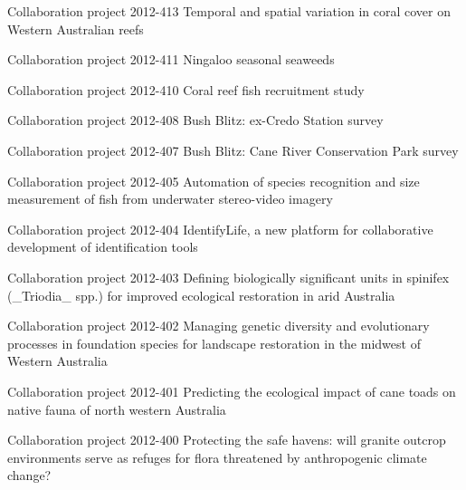 \documentclass[version=last, paper=a4, DIV=18, usenames, dvipsnames]{scrartcl}
\begin{document}
\begin{longtabu}
  Collaboration project 2012-413 Temporal and spatial variation in coral cover on Western Australian reefs \newline  \\ \hline

  Collaboration project 2012-411 Ningaloo seasonal seaweeds \newline  \\ \hline

  Collaboration project 2012-410 Coral reef fish recruitment study \newline  \\ \hline

  Collaboration project 2012-408 Bush Blitz: ex-Credo Station survey \newline  \\ \hline

  Collaboration project 2012-407 Bush Blitz: Cane River Conservation Park survey \newline  \\ \hline

  Collaboration project 2012-405 Automation of species recognition and size measurement of fish from underwater stereo-video imagery \newline  \\ \hline

  Collaboration project 2012-404 IdentifyLife, a new platform for collaborative development of identification tools \newline  \\ \hline

  Collaboration project 2012-403 Defining biologically significant units in spinifex (\_Triodia\_ spp.) for improved ecological restoration in arid Australia \newline  \\ \hline

  Collaboration project 2012-402 Managing genetic diversity and evolutionary processes in foundation species for landscape restoration in the midwest of Western Australia \newline  \\ \hline

  Collaboration project 2012-401 Predicting the ecological impact of cane toads on native fauna of north western Australia \newline  \\ \hline

  Collaboration project 2012-400 Protecting the safe havens: will granite outcrop environments serve as refuges for flora threatened by anthropogenic climate change? \newline  \\ \hline

\end{longtabu}
\end{document}
